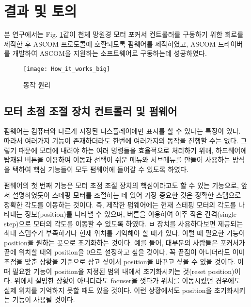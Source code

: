 \section{결과 및 토의}

본 연구에서는 Fig. \ref{fig:How_it_works_big}\과 같이 천체 망원경 모터 포커서 컨트롤러를 구동하기 위한 회로를 제작한 후 ASCOM 프로토콜에 호환되도록 펌웨어를 제작하였고, ASCOM 드라이버를 개발하여 ASCOM을 지원하는 소프트웨어로 구동하는데 성공하였다.

\begin{figure}[h]
	\begin{center}
		\texttt{[image: How\_it\_works\_big]}
		\caption{동작 원리}
		\label{fig:How_it_works_big}
	\end{center}
\end{figure}

\subsection{모터 초점 조절 장치 컨트롤러 및 펌웨어}

펌웨어는 컴퓨터와 다르게 지정된 디스플레이에만 표시를 할 수 있다는 특징이 있다. 따라서 여러가지 기능이 존재하더라도 한번에 여러가지의 동작을 진행할 수는 없다. 그렇기 때문에 모터에 내려야 하는 여러 명령들을 효율적으로 처리하기 위해, 하드웨어에 탑재된 버튼을 이용하여 이동과 선택이 쉬운 메뉴와 서브메뉴를 만들어 사용하는 방식을 택하여 핵심 기능들이 모두 펌웨어에 들어갈 수 있도록 하였다.

펌웨어의 첫 번째 기능은 모터 초점 조절 장치의 핵심이라고도 할 수 있는 기능으로, 앞서 설명하였듯이 스테핑 모터를 조절하는 데 있어 가장 중요한 것은 정확한 스텝으로 정확한 각도를 이동하는 것이다. 즉, 제작한 펌웨어에는 현재 스테핑 모터의 각도를 나타내는 정보(position)를 나타낼 수 있으며, 버튼을 이용하여 아주 작은 간격(single step)으로 모터의 각도를 이동할 수 있도록 하였다.
ㅂ
장치를 사용하다보면 제공되는 최대 스텝수가 부족하거나 현재 위치를 기억해야 할 때가 있다. 이럴 때 필요한 기능이 position을 원하는 곳으로 초기화하는 것이다. 예를 들어, 대부분의 사람들은 포커서가 끝에 위치할 때의 position을 0으로 설정하고 싶을 것이다. 꼭 끝점이 아니더라도 이미 초점을 맞춘 상황을 기준으로 삼고 싶어서 position을 바꾸고 싶을 수 있을 것이다. 이 때 필요한 기능이 position을 지정된 범위 내에서 초기화시키는 것(reset position)이다. 위에서 설명한 상황이 아니더라도 focuser을 껏다가 위치를 이동시켰던 경우에도 실제 위치를 기억하지 못할 때도 있을 것이다. 이런 상황에서도 position을 초기화시키는 기능이 사용될 것이다.

